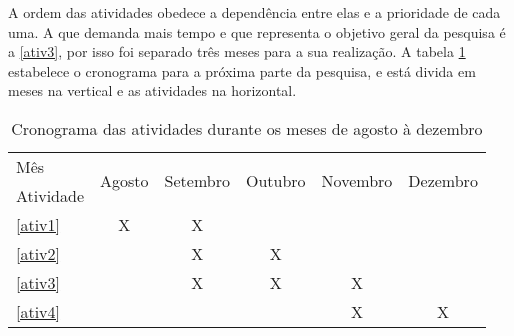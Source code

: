 A ordem das atividades obedece a dependência entre elas e a prioridade de cada uma. A que demanda mais tempo e que representa o objetivo geral da pesquisa é a \ref{ativ3}, por isso foi separado três meses para a sua realização. A tabela \ref{cronograma} estabelece o cronograma para a próxima parte da pesquisa, e está divida em meses na vertical e as atividades na horizontal. 

\begin{table}[!htbp]
\centering
\caption{Cronograma das atividades durante os meses de agosto à dezembro}
\label{cronograma}
\begin{tabular}{|l|c|c|c|c|c|}
\hline
Mês & \multicolumn{1}{l|}{\multirow{2}{*}{Agosto}} & \multicolumn{1}{l|}{\multirow{2}{*}{Setembro}} & \multicolumn{1}{l|}{\multirow{2}{*}{Outubro}} & \multicolumn{1}{l|}{\multirow{2}{*}{Novembro}} & \multicolumn{1}{l|}{\multirow{2}{*}{Dezembro}} \\ \cline{1-1}
Atividade & \multicolumn{1}{l|}{} & \multicolumn{1}{l|}{} & \multicolumn{1}{l|}{} & \multicolumn{1}{l|}{} & \multicolumn{1}{l|}{} \\ \hline
\ref{ativ1} & X & X &  &  &  \\ \hline
\ref{ativ2} &  & X & X &  &  \\ \hline
\ref{ativ3} &  & X & X & X &  \\ \hline
\ref{ativ4} &  &  &  & X & X \\ \hline
\end{tabular}
\end{table}










